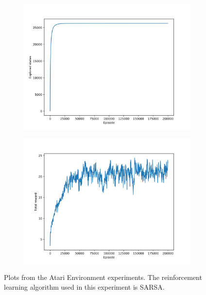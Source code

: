 \begin{figure}
\begin{subfigure}[h]{0.5\linewidth}
\includegraphics[width=\linewidth]{images/atari-sarsa-explored-states.png}
\end{subfigure}
\hfill
\begin{subfigure}[h]{0.5\linewidth}
\includegraphics[width=\linewidth]{images/atari-sarsa-total-reward.png}
\end{subfigure}
\caption{Plots from the Atari Environment experiments. The reinforcement learning algorithm used in this experiment is SARSA.}
\end{figure}

